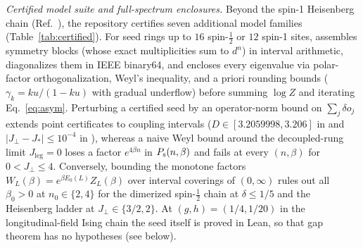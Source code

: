 \documentclass[aps,prl,reprint,amsmath,amssymb,nofootinbib,raggedbottom]{revtex4-2}
\begin{document}
\emph{Certified model suite and full-spectrum enclosures.}
Beyond the spin-1 Heisenberg chain (Ref.~\cite{cert}), the repository certifies
seven additional model families (Table~\ref{tab:certified}). For seed rings up
to $16$ spin-$\tfrac12$ or $12$ spin-1 sites, 
assembles symmetry blocks (whose exact multiplicities sum to $d^n$) in interval
arithmetic, diagonalizes them in IEEE binary64, and encloses every eigenvalue
via polar-factor orthogonalization, Weyl's inequality, and a priori rounding
bounds ($\gamma_k=ku/(1-ku)$ with gradual underflow) before summing $\log Z$
and iterating Eq.~\eqref{eq:asym}. Perturbing a certified seed by an
operator-norm bound on $\sum_j\delta o_j$ extends point certificates to coupling
intervals ($D\in[3.2059998,3.206]$ in  and
$|J_\perp-J_*|\le10^{-4}$ in ), whereas a naive
Weyl bound around the decoupled-rung limit $J_{\mathrm{leg}}=0$ loses a factor
$e^{4\beta n}$ in $P_{\mathrm s}(n,\beta)$ and fails at every $(n,\beta)$ for
$0<J_\perp\le4$. Conversely, bounding the monotone
factors $W_L(\beta)=e^{\beta E_0(L)}Z_L(\beta)$ over interval coverings of
$(0,\infty)$ rules out all $\beta_0>0$ at $n_0\in\{2,4\}$ for the dimerized
spin-$\tfrac12$ chain at $\delta\le1/5$ and the Heisenberg ladder at
$J_\perp\in\{3/2,2\}$. At $(g,h)=(1/4,1/20)$ in the longitudinal-field Ising chain the seed itself
is proved in Lean, so that gap theorem has no hypotheses (see below).
\end{document}
